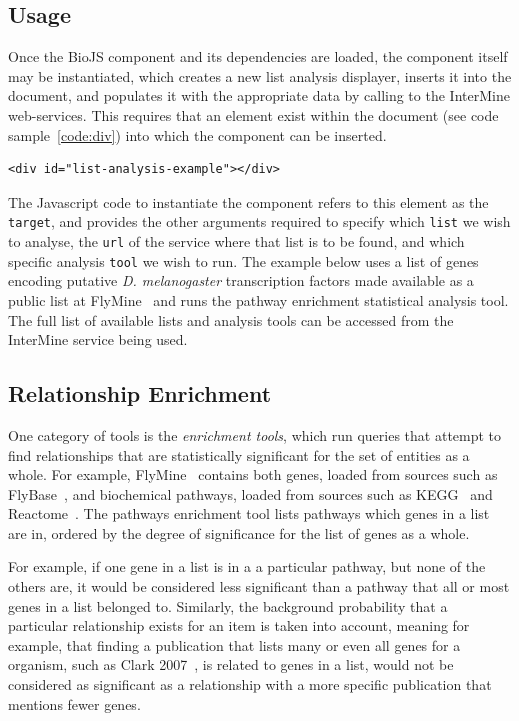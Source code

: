 \documentclass[10pt,a4paper,twocolumn]{article}
\begin{document}
\subsection*{Usage}

Once the BioJS component and its dependencies are loaded, the component itself may be
instantiated, which creates a new list analysis displayer, inserts it into the document, 
and populates it with the appropriate data by calling to the InterMine web-services. This
requires that an element exist within the document (see code sample~\ref{code:div})
into which the component can be inserted.

\begin{lstlisting}[caption={The target document element},label={code:div}]
<div id="list-analysis-example"></div>
\end{lstlisting}

The Javascript code to instantiate the component refers to this element as the \texttt{target},
and provides the other arguments required to specify which \texttt{list} we wish to analyse, 
the \texttt{url} of the service where that list is to be found, and which specific analysis 
\texttt{tool} we wish to run. The example below uses a list of genes encoding putative \emph{D. melanogaster}
transcription factors made available as a public list at 
FlyMine~\cite{site:flymine}
and runs the pathway enrichment statistical analysis tool. The full list of available lists and 
analysis tools can be accessed from the InterMine service being used.

\subsection*{Relationship Enrichment}

One category of tools is the \emph{enrichment tools}, which run queries that attempt to find
relationships that are statistically significant for the set of entities as a whole.
For example, FlyMine~\cite{site:flymine} contains both genes, loaded from sources such as
FlyBase~\cite{site:flybase}, and biochemical pathways, loaded from sources
such as KEGG~\cite{site:kegg} and Reactome~\cite{site:reactome}.
The pathways enrichment tool lists pathways which genes in a list are in, ordered by the degree
of significance for the list of genes as a whole.

For example, if one gene in a list is in a
a particular pathway, but none of the others are, it would be considered less significant
than a pathway that all or most genes in a list belonged to. Similarly, the background
probability that a particular relationship exists for an item is taken into account, meaning for
example, that finding a publication that lists many or even all genes for a organism, such as
Clark 2007~\cite{Clark:2007}, is related to genes in a list, would not be considered as significant
as a relationship with a more specific publication that mentions fewer genes.
\end{document}
